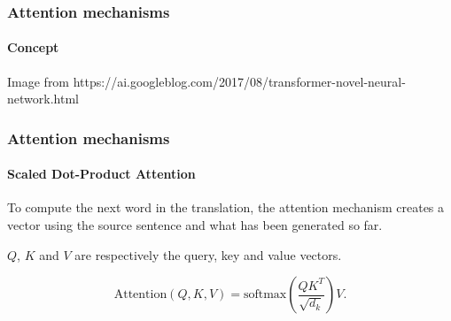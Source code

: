 \documentclass[9pt]{beamer}
\begin{document}
\begin{frame}
  \frametitle{Attention mechanisms}

  \framesubtitle{Concept}

  \begin{figure}

  \end{figure}

  {\tiny Image from https://ai.googleblog.com/2017/08/transformer-novel-neural-network.html}
\end{frame}

\begin{frame}

  \frametitle{Attention mechanisms}

  \framesubtitle{Scaled Dot-Product Attention}

  \medskip

  To compute the next word in the translation, the attention mechanism
  creates a vector using the source sentence and what has been
  generated so far.

  \begin{figure}
    \scalebox{0.85}{
      
    }
  \end{figure}

  $Q$, $K$ and $V$ are respectively the query, key and value vectors.

  \bigskip

  \[
  \text{Attention}(Q, K, V) = \text{softmax}(\frac{QK^{T}}{\sqrt{d_{k}}}) V.
  \]

\end{frame}
\end{document}
